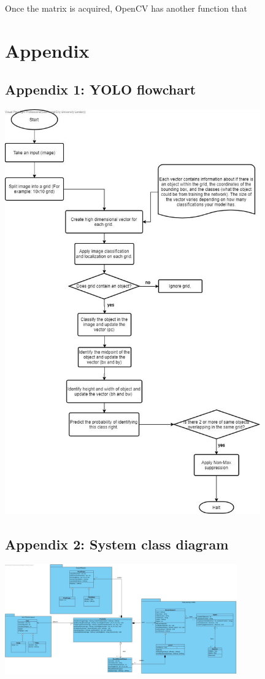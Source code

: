 \documentclass[12pt]{report}
\begin{document}
Once the matrix is acquired, OpenCV has another function that  


\chapter*{Appendix}

\section*{Appendix 1: YOLO flowchart}

\includegraphics[width=110mm]{./images/YOLO.jpg}

\section*{Appendix 2: System class diagram}

\includegraphics[angle = 90,width=100mm]{./images/SD Class diagram.jpg}
\end{document}
